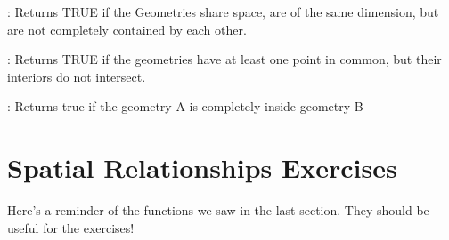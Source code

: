 \documentclass[a4paper,11pt,english]{sphinxmanual}
\begin{document}
: Returns TRUE if the Geometries share space, are of the same dimension, but are not completely contained by each other.

: Returns TRUE if the geometries have at least one point in common, but their interiors do not intersect.

: Returns true if the geometry A is completely inside geometry B


\section{Spatial Relationships Exercises}
\label{\detokenize{basic:spatial-relationships-exercises}}\label{\detokenize{basic:id11}}
Here’s a reminder of the functions we saw in the last section. They should be useful for the exercises!
\end{document}
